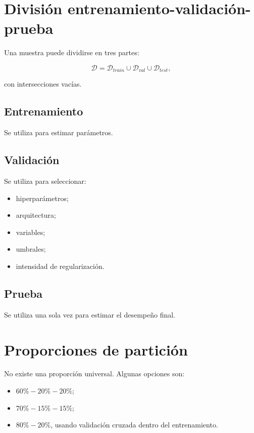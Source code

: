 \documentclass[
  spanish,
  11pt,
  letterpaper,
  DIV=11,
  numbers=noendperiod]{scrreprt}
\providecommand{\tightlist}{%
  \setlength{\itemsep}{0pt}\setlength{\parskip}{0pt}}
\theoremstyle{definition}
\theoremstyle{plain}
\theoremstyle{definition}
\theoremstyle{remark}
\begin{document}
\section{División
entrenamiento-validación-prueba}\label{divisiuxf3n-entrenamiento-validaciuxf3n-prueba}

Una muestra puede dividirse en tres partes:

\[
\mathcal{D}
=
\mathcal{D}_{train}
\cup
\mathcal{D}_{val}
\cup
\mathcal{D}_{test},
\]

con intersecciones vacías.

\subsection{Entrenamiento}\label{entrenamiento}

Se utiliza para estimar parámetros.

\subsection{Validación}\label{validaciuxf3n}

Se utiliza para seleccionar:

\begin{itemize}
\tightlist
\item
  hiperparámetros;
\item
  arquitectura;
\item
  variables;
\item
  umbrales;
\item
  intensidad de regularización.
\end{itemize}

\subsection{Prueba}\label{prueba}

Se utiliza una sola vez para estimar el desempeño final.

\section{Proporciones de partición}\label{proporciones-de-particiuxf3n}

No existe una proporción universal. Algunas opciones son:

\begin{itemize}
\tightlist
\item
  \(60\%-20\%-20\%\);
\item
  \(70\%-15\%-15\%\);
\item
  \(80\%-20\%\), usando validación cruzada dentro del entrenamiento.
\end{itemize}
\end{document}
